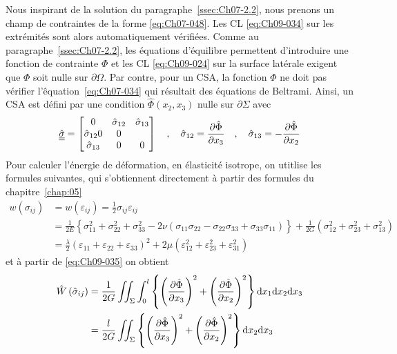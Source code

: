 Nous inspirant de la solution du paragraphe~\ref{ssec:Ch07-2.2}, nous prenons un champ de contraintes de la forme \eqref{eq:Ch07-048}.
Les CL \eqref{eq:Ch09-034} sur les extrémités sont alors automatiquement vérifiées.
Comme au paragraphe~\ref{ssec:Ch07-2.2}, les équations d'équilibre permettent d'introduire une fonction de contrainte $\Phi$ et les CL \eqref{eq:Ch09-024} sur la surface latérale exigent que $\Phi$ soit nulle sur $\partial \Omega$.
Par contre, pour un CSA, la fonction $\Phi$ ne doit pas vérifier l'êquation~\eqref{eq:Ch07-034} qui résultait des équations de Beltrami.
Ainsi, un CSA est défini par une condition $\hat{\Phi} (x_2, x_3)$ nulle sur $\partial \Sigma$ avec
\begin{equation}
    \hat{\underline{\underline{\sigma}}} = 
    \begin{bmatrix}
        0 & \hat{\sigma}_{12} & \hat{\sigma}_{13} \\
        \hat{\sigma}_{12} 0 & 0 \\
        \hat{\sigma}_{13} & 0 & 0
    \end{bmatrix}
    \quad , \quad \hat{\sigma}_{12} = \frac{\partial \hat{\Phi}}{\partial x_3} \quad,\quad \hat{\sigma}_{13} = - \frac{\partial \hat{\Phi}}{\partial x_2}
    \label{eq:Ch09-035}
\end{equation}
Pour calculer l'énergie de déformation, en élasticité isotrope, on utitlise les formules suivantes, qui s'obtiennent directement à partir des formules du chapitre~\ref{chap:05}
\begin{align}
    w(\sigma_{ij}) &= w (\varepsilon_{ij}) = \frac{1}{2} \sigma_{ij} \varepsilon_{ij} \\
    &= \frac{1}{2E} \left\{ \sigma_{11}^2 + \sigma_{22}^2 + \sigma_{33}^2 - 2 \nu \left( \sigma_{11} \sigma_{22} - \sigma_{22} \sigma_{33} + \sigma_{33}\sigma_{11} \right) \right\} + \frac{1}{2G} \left( \sigma_{12}^2 + \sigma_{23}^2 + \sigma_{13}^2 \right) \\
    &= \frac{\lambda}{2} \left( \varepsilon_{11} + \varepsilon_{22} + \varepsilon_{33} \right)^2 + 2\mu \left( \varepsilon_{12}^2 + \varepsilon_{23}^2 + \varepsilon_{31}^2 \right)
    \label{eq:Ch09-036}
\end{align}
et à partir de \eqref{eq:Ch09-035} on obtient 
\begin{align}
    \hat{W}\left( \hat{\sigma}_{ij} \right) &= \frac{1}{2G} \iint_{\Sigma} \int_0^l \left\{ \left( \frac{\partial \hat{\Phi}}{\partial x_3} \right)^2 + \left( \frac{\partial \hat{\Phi}}{\partial x_2} \right)^2 \right\} \mathrm{d} x_1 \mathrm{d} x_2 \mathrm{d} x_3 \\
    &= \frac{l}{2G} \iint_{\Sigma} \left\{ \left( \frac{\partial \hat{\Phi}}{\partial x_3} \right)^2 + \left( \frac{\partial \hat{\Phi}}{\partial x_2} \right)^2 \right\} \mathrm{d} x_2 \mathrm{d} x_3
    \label{eq:Ch09-037}
\end{align}
